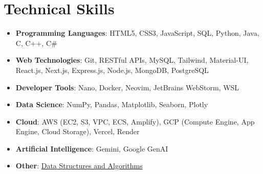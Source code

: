 \documentclass[letterpaper,11pt]{article}
\newcommand{\resumeItem}[1]{
  \item\small{#1 \vspace{-2pt}}
}
\newcommand{\resumeSubHeadingListStart}{\begin{itemize}[leftmargin=0.15in, label={}]}
\newcommand{\resumeSubHeadingListEnd}{\end{itemize}}
\begin{document}
\section{Technical Skills}
\resumeSubHeadingListStart
  \resumeItem{\textbf{Programming Languages}: HTML5, CSS3, JavaScript, SQL, Python, Java, C, C++, C\#} \\
  \resumeItem{\textbf{Web Technologies}: Git, RESTful APIs, MySQL, Tailwind, Material-UI, React.js, Next.js, Express.js, Node.js, MongoDB, PostgreSQL} \\
  \resumeItem{\textbf{Developer Tools}: Nano, Docker, Neovim, JetBrains WebStorm, WSL} \\
  \resumeItem{\textbf{Data Science}: NumPy, Pandas, Matplotlib, Seaborn, Plotly} \\
  \resumeItem{\textbf{Cloud}: AWS (EC2, S3, VPC, ECS, Amplify), GCP (Compute Engine, App Engine, Cloud Storage), Vercel, Render} \\
  \resumeItem{\textbf{Artificial Intelligence}: Gemini, Google GenAI} \\
  \resumeItem{\textbf{Other}: \href{https://github.com/abhay-byte/DSA_Practice}{Data Structures and Algorithms}} 
\resumeSubHeadingListEnd

\end{document}
